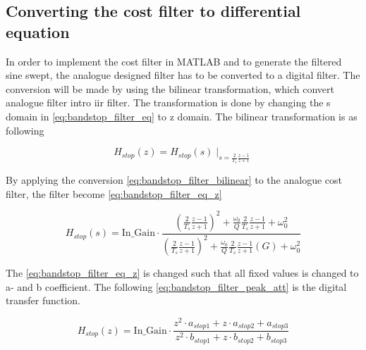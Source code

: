 \subsection{Converting the cost filter to differential equation}
In order to implement the cost filter in MATLAB and to generate the filtered sine swept, the analogue designed filter has to be converted to a digital filter. The conversion will be made by using the bilinear transformation, which convert analogue filter intro \gls{iir} filter.  The transformation is done by changing the s domain in \autoref{eq:bandstop_filter_eq} to z domain. The bilinear transformation is as following 

\begin{equation}\label{eq:bandstop_filter_bilinear}
H_{stop}(z) = H_{stop}(s) \mid_{s=\frac{2}{T_s}\frac{z-1}{z+1}} 
\end{equation}

    \startexplain
    \stopexplain

By applying the conversion \autoref{eq:bandstop_filter_bilinear} to the analogue cost filter, the filter become \autoref{eq:bandstop_filter_eq_z}

\begin{equation}\label{eq:bandstop_filter_eq_z}
H_{stop}(s) = \text{In_Gain} \cdot \frac{(\frac{2}{T_s}\frac{z-1}{z+1})^2+\frac{\omega_0}{Q}\frac{2}{T_s}\frac{z-1}{z+1}+\omega_0^2}{(\frac{2}{T_s}\frac{z-1}{z+1})^2+\frac{\omega_0}{Q}\frac{2}{T_s}\frac{z-1}{z+1}(G)+\omega_0^2}
\end{equation}

The \autoref{eq:bandstop_filter_eq_z} is changed such that all fixed values is changed to a- and b coefficient. The following \autoref{eq:bandstop_filter_peak_att} is the digital transfer function.


\begin{equation}\label{eq:bandstop_filter_peak_att}
        H_{stop}(z) =  \text{In_Gain} \cdot \frac{z^2 \cdot a_{stop1} + z \cdot a_{stop2} + a_{stop3}}{z^2 \cdot b_{stop1} + z \cdot b_{stop2} + b_{stop3}}
    \end{equation}
    
    \startexplain
    \stopexplain

